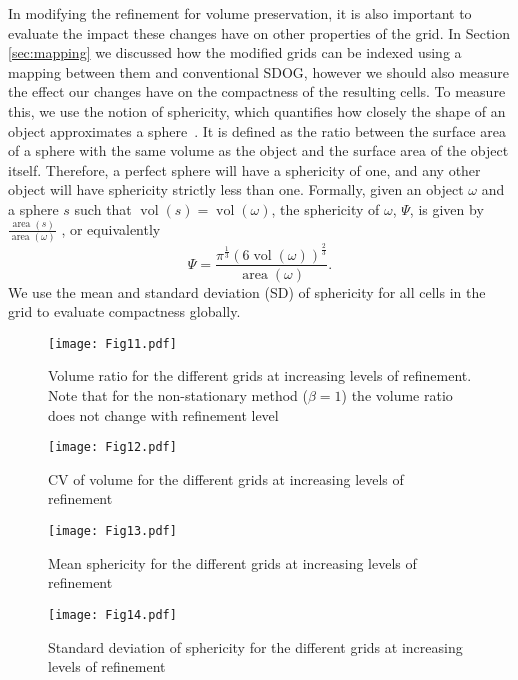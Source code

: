 In modifying the refinement for volume preservation, it is also important to evaluate the impact these changes have on other properties of the grid.
In Section \ref{sec:mapping} we discussed how the modified grids can be indexed using a mapping between them and conventional SDOG, however we should also measure the effect our changes have on the compactness of the resulting cells.
To measure this, we use the notion of sphericity, which quantifies how closely the shape of an object approximates a sphere~\cite{wadell1935volume}.
It is defined as the ratio between the surface area of a sphere with the same volume as the object and the surface area of the object itself.
Therefore, a perfect sphere will have a sphericity of one, and any other object will have sphericity strictly less than one.
Formally, given an object $\omega$ and a sphere $s$ such that $\operatorname{vol}(s) = \operatorname{vol}(\omega)$, the sphericity of $\omega$, $\Psi$, is given by $\frac{\operatorname{area}(s)}{\operatorname{area}(\omega)}$ , or equivalently 
%
\begin{equation}
\Psi = \frac{\pi^{\frac{1}{3}}\left( 6\operatorname{vol}(\omega) \right)^{\frac{2}{3}}}{\operatorname{area}(\omega)}.
\label{eq:sphericity}
\end{equation}
%
We use the mean and standard deviation (SD) of sphericity for all cells in the grid to evaluate compactness globally.


\begin{figure}[tb]
	\centering
	\texttt{[image: Fig11.pdf]}
	\caption[Title]{
		Volume ratio for the different grids at increasing levels of refinement.
		Note that for the non-stationary method ($\beta = 1$) the volume ratio does not change with refinement level
	}
	\label{fig:vr}
\end{figure}


\begin{figure}[tb]
	\centering
	\texttt{[image: Fig12.pdf]}
	\caption[Title]{
		CV of volume for the different grids at increasing levels of refinement
	}
	\label{fig:cv}
\end{figure}


\begin{figure}[tb]
	\centering
	\texttt{[image: Fig13.pdf]}
	\caption[Title]{
		Mean sphericity for the different grids at increasing levels of refinement
	}
	\label{fig:sph}
\end{figure}


\begin{figure}[tb]
	\centering
	\texttt{[image: Fig14.pdf]}
	\caption[Title]{
		Standard deviation of sphericity for the different grids at increasing levels of refinement
	}
	\label{fig:sd-sph}
\end{figure}


